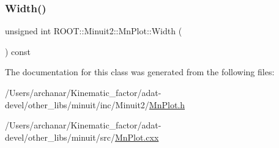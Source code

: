 \subsubsection{\texorpdfstring{Width()}{Width()}\hspace{0.1cm}{\footnotesize\ttfamily [3/3]}}
{\footnotesize\ttfamily unsigned int R\+O\+O\+T\+::\+Minuit2\+::\+Mn\+Plot\+::\+Width (\begin{DoxyParamCaption}{ }\end{DoxyParamCaption}) const\hspace{0.3cm}{\ttfamily [inline]}}



The documentation for this class was generated from the following files\+:\begin{DoxyCompactItemize}
\item 
/\+Users/archanar/\+Kinematic\+\_\+factor/adat-\/devel/other\+\_\+libs/minuit/inc/\+Minuit2/\mbox{\hyperlink{adat-devel_2other__libs_2minuit_2inc_2Minuit2_2MnPlot_8h}{Mn\+Plot.\+h}}\item 
/\+Users/archanar/\+Kinematic\+\_\+factor/adat-\/devel/other\+\_\+libs/minuit/src/\mbox{\hyperlink{adat-devel_2other__libs_2minuit_2src_2MnPlot_8cxx}{Mn\+Plot.\+cxx}}\end{DoxyCompactItemize}
